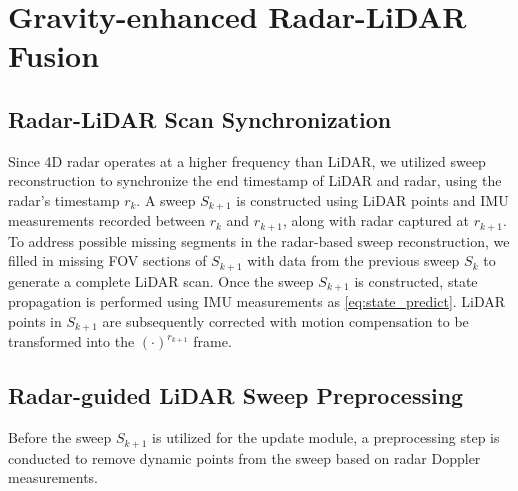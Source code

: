 
\section{Gravity-enhanced Radar-LiDAR Fusion}
\subsection{Radar-LiDAR Scan Synchronization}
\label{subsec:Scan_Synchronization}
Since 4D radar operates at a higher frequency than \ac{LiDAR}, we utilized sweep reconstruction \cite{SR-LIVO} to synchronize the end timestamp of \ac{LiDAR} and radar, using the radar's timestamp $r_k$. A sweep $S_{k+1}$ is constructed using \ac{LiDAR} points and \ac{IMU} measurements recorded between $r_k$ and $r_{k+1}$, along with radar captured at $r_{k+1}$. To address possible missing segments in the radar-based sweep reconstruction, we filled in missing \ac{FOV} sections of $S_{k+1}$ with data from the previous sweep $S_k$ to generate a complete \ac{LiDAR} scan. 
Once the sweep $S_{k+1}$ is constructed, state propagation is performed using \ac{IMU} measurements as \eqref{eq:state_predict}. \ac{LiDAR} points in $S_{k+1}$ are subsequently corrected with motion compensation to be transformed into the $\left ( \cdot \right )^{r_{k+1}}$ frame.

\subsection{Radar-guided LiDAR Sweep Preprocessing}
\label{subsec:Scan Filtering}
Before the sweep $S_{k+1}$ is utilized for the update module, a preprocessing step is conducted to remove dynamic points from the sweep based on radar Doppler measurements.
